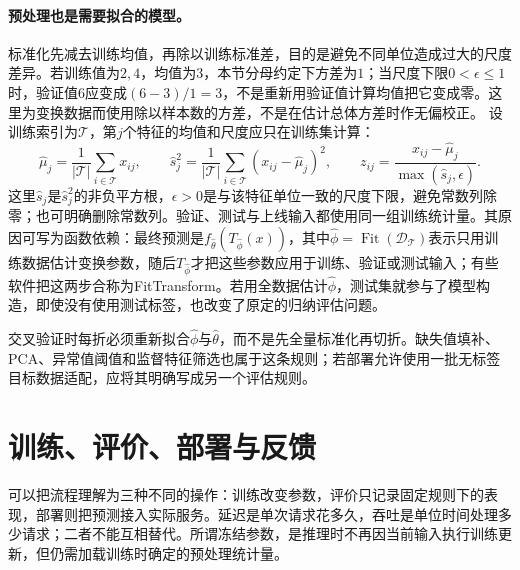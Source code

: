 \paragraph{预处理也是需要拟合的模型。}
标准化先减去训练均值，再除以训练标准差，目的是避免不同单位造成过大的尺度差异。若训练值为$2,4$，均值为$3$，本节分母约定下方差为$1$；当尺度下限$0<\epsilon\leq1$时，验证值$6$应变成$(6-3)/1=3$，不是重新用验证值计算均值把它变成零。这里为变换数据而使用除以样本数的方差，不是在估计总体方差时作无偏校正。
设训练索引为$\mathcal T$，第$j$个特征的均值和尺度应只在训练集计算：
\begin{equation}
 \hat\mu_j=\frac1{|\mathcal T|}\sum_{i\in\mathcal T}x_{ij},\qquad
 \hat s_j^2=\frac1{|\mathcal T|}\sum_{i\in\mathcal T}(x_{ij}-\hat\mu_j)^2,
 \qquad z_{ij}=\frac{x_{ij}-\hat\mu_j}{\max(\hat s_j,\epsilon)}.
\end{equation}
这里$\hat s_j$是$\hat s_j^2$的非负平方根，$\epsilon>0$是与该特征单位一致的尺度下限，避免常数列除零；也可明确删除常数列。验证、测试与上线输入都使用同一组训练统计量。其原因可写为函数依赖：最终预测是$f_{\hat\theta}(T_{\hat\phi}(x))$，其中$\hat\phi=\operatorname{Fit}(\mathcal D_{\mathcal T})$表示只用训练数据估计变换参数，随后$T_{\hat\phi}$才把这些参数应用于训练、验证或测试输入；有些软件把这两步合称为FitTransform。若用全数据估计$\hat\phi$，测试集就参与了模型构造，即使没有使用测试标签，也改变了原定的归纳评估问题。

交叉验证时每折必须重新拟合$\hat\phi$与$\hat\theta$，而不是先全量标准化再切折。缺失值填补、PCA、异常值阈值和监督特征筛选也属于这条规则；若部署允许使用一批无标签目标数据适配，应将其明确写成另一个评估规则。

\section{训练、评价、部署与反馈}
可以把流程理解为三种不同的操作：训练改变参数，评价只记录固定规则下的表现，部署则把预测接入实际服务。延迟是单次请求花多久，吞吐是单位时间处理多少请求；二者不能互相替代。所谓冻结参数，是推理时不再因当前输入执行训练更新，但仍需加载训练时确定的预处理统计量。

